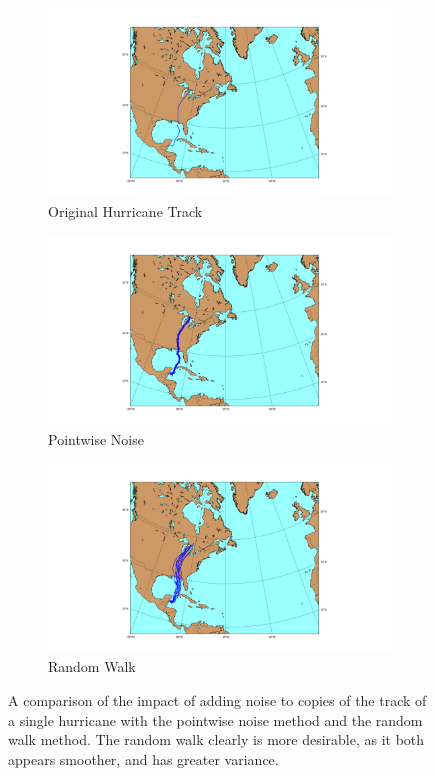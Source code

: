 \begin{figure}
	\centering
	\begin{subfigure}[t]{0.32\textwidth}
		\centering
		\includegraphics[width=\linewidth, trim=350 50 300 50, clip]{images/individual_no_noise.png}
		\caption{Original Hurricane Track}
	\end{subfigure}
	\begin{subfigure}[t]{0.32\textwidth}
		\centering
		\includegraphics[width=\linewidth, trim=350 50 300 50, clip]{images/individual_pointwise.png}
		\caption{Pointwise Noise}
	\end{subfigure}
	\begin{subfigure}[t]{0.32\textwidth}
		\centering
		\includegraphics[width=\linewidth, trim=350 50 300 50, clip]{images/individual_random_walk.png}
		\caption{Random Walk}
	\end{subfigure}
	\caption{A comparison of the impact of adding noise to copies of the track of a single hurricane with the pointwise noise method and the random walk method. The random walk clearly is more desirable, as it both appears smoother, and has greater variance.}
	\label{fig:different_noise}
\end{figure}

